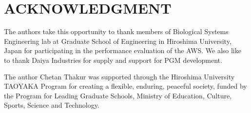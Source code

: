 \documentclass[letterpaper, 10 pt, conference]{ieeeconf}  %
\begin{document}








\section*{ACKNOWLEDGMENT}
The authors take this opportunity to thank members of Biological Systems Engineering lab at Graduate School of Engineering in Hiroshima University, Japan for participating in the performance evaluation of the AWS. We also like to thank Daiya Industries for supply and support for PGM development.  

The author Chetan Thakur was supported through the Hiroshima University
TAOYAKA Program for creating a flexible, enduring, peaceful society, funded by the Program for Leading
Graduate Schools, Ministry of Education, Culture, Sports, Science and Technology. 
\end{document}
